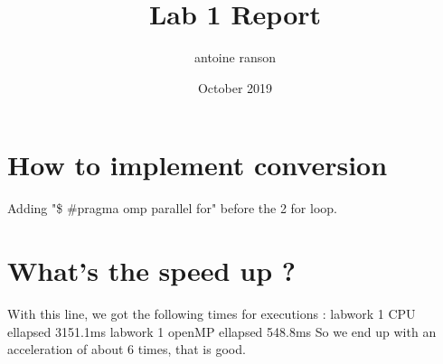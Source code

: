 \documentclass{article}
\title{Lab 1 Report }
\author{antoine ranson }
\date{October 2019}
\begin{document}
\maketitle 

\section{How to implement conversion} 
Adding "\$ \#pragma omp parallel for" before the 2 for loop.\newline 

\section{What's the speed up ?} 
With this line, we got the following times for executions :\newline 
labwork 1 CPU ellapsed 3151.1ms \newline 
labwork 1 openMP ellapsed 548.8ms\newline 
So we end up with an acceleration of about 6 times, that is good. 
\end{document}
